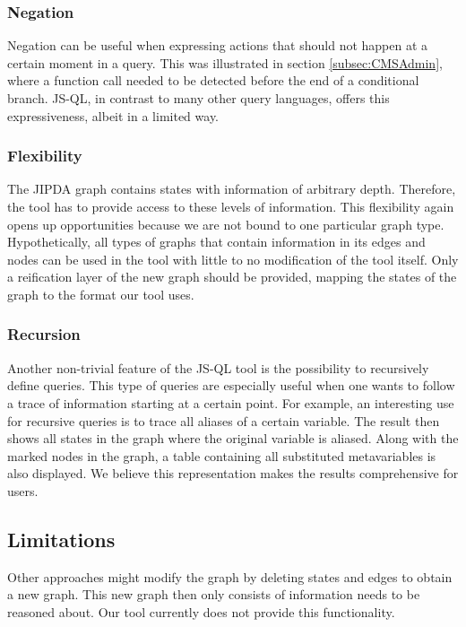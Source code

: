 \subsubsection*{Negation}
Negation can be useful when expressing actions that should not happen at a certain moment in a query. This was illustrated in section \ref{subsec:CMSAdmin}, where a function call needed to be detected before the end of a conditional branch. JS-QL, in contrast to many other query languages, offers this expressiveness, albeit in a limited way. 

\subsubsection*{Flexibility}
The JIPDA graph contains states with information of arbitrary depth. Therefore, the tool has to provide access to these levels of information. This flexibility again opens up opportunities because we are not bound to one particular graph type. Hypothetically, all types of graphs that contain information in its edges and nodes can be used in the tool with little to no modification of the tool itself. Only a reification layer of the new graph should be provided, mapping the states of the graph to the format our tool uses.

\subsubsection*{Recursion}
Another non-trivial feature of the JS-QL tool is the possibility to recursively define queries. This type of queries are especially useful when one wants to follow a trace of information starting at a certain point. For example, an interesting use for recursive queries is to trace all aliases of a certain variable. The result then shows all states in the graph where the original variable is aliased. Along with the marked nodes in the graph, a table containing all substituted metavariables is also displayed. We believe this representation makes the results comprehensive for users.

\subsection{Limitations}

Other approaches might modify the graph by deleting states and edges to obtain a new graph. This new graph then only consists of information needs to be reasoned about. Our tool currently does not provide this functionality. 

